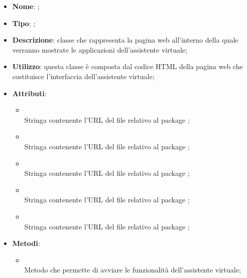 \begin{itemize}
	\item \textbf{Nome}: ;
	\item \textbf{Tipo}: ;
	\item \textbf{Descrizione}: classe che rappresenta la pagina web all'interno della quale verranno mostrate le applicazioni dell'assistente virtuale;
	\item \textbf{Utilizzo}: questa classe è composta dal codice HTML della pagina web che costituisce l'interfaccia dell'assistente virtuale;
	\item \textbf{Attributi}:
	\begin{itemize}
		\item[]  \\
		Stringa contenente l'URL del file relativo al package ;
		\item[]  \\
		Stringa contenente l'URL del file relativo al package ;
		\item[]  \\
		Stringa contenente l'URL del file relativo al package ;
		\item[]  \\
		Stringa contenente l'URL del file relativo al package ;
		\item[]  \\
		Stringa contenente l'URL del file relativo al package ;
	\end{itemize}
	\item \textbf{Metodi}:
	\begin{itemize}
		\item[]  \\
		Metodo che permette di avviare le funzionalità dell'assistente virtuale;\\
	\end{itemize}
\end{itemize}
\FloatBarrier

